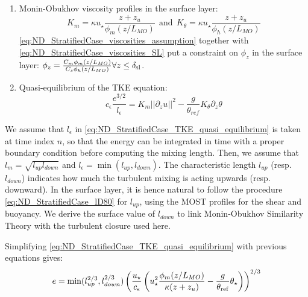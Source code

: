 \begin{enumerate}
\item
Monin-Obukhov viscosity profiles in the surface layer:
\begin{equation}
	\label{eq:ND_StratifiedCase_viscosities_SL}
	K_m = \kappa u_\star\frac{z+ z_{u}}{\phi_m(z/L_{MO})} ~~\text{and}~~
K_\theta = \kappa u_\star\frac{z+ z_{u}}{\phi_h(z/L_{MO})}
\end{equation}
\eqref{eq:ND_StratifiedCase_viscosities_assumption}
together with \eqref{eq:ND_StratifiedCase_viscosities_SL} put
a constraint on $\phi_z$ in the surface layer:
$\phi_z = \frac{C_m\phi_m(z/L_{MO})}{C_s\phi_h(z/L_{MO})}
		\forall z\leq \delta_{\rm sl}$.
\item Quasi-equilibrium of the TKE equation:
\begin{equation}
	\label{eq:ND_StratifiedCase_TKE_quasi_equilibrium}
	c_\epsilon \frac{e^{3/2}}{l_\epsilon}=K_m ||\partial_z u||^2 - \frac{g}{\theta_{ref}} K_\theta \partial_z \theta
\end{equation}
\end{enumerate}
We assume that $l_\epsilon$ in
\eqref{eq:ND_StratifiedCase_TKE_quasi_equilibrium} is taken at
time index $n$, so that the energy can be integrated in time
with a proper boundary condition before computing the mixing
length. Then, we assume that $l_m = \sqrt{l_{up}l_{down}}$ and
$l_\epsilon = \min(l_{up}, l_{down})$.
The characteristic length $l_{up}$ (resp. $l_{down}$) indicates
how much the turbulent mixing is acting upwards (resp. downward).
In the surface layer, it is hence natural to follow the
procedure \eqref{eq:ND_StratifiedCase_lD80} for $l_{up}$,
using the MOST profiles for the shear and buoyancy.
We derive the surface value of $l_{down}$ to link Monin-Obukhov
Similarity Theory with the turbulent closure used here.
\par
Simplifying \eqref{eq:ND_StratifiedCase_TKE_quasi_equilibrium}
with previous equations gives:
\begin{equation}
	\label{eq:ND_StratifiedCase_TKE_quasi_equilibrium_simplified}
	e = \min(l_{up}^{2/3}, l_{down}^{2/3})\left(
	\frac{u_\star}{c_\epsilon} 
	\left({u}_\star^2
	\frac{\phi_m(z/L_{MO})}{\kappa (z+z_{u})}
	- \frac{g}{\theta_{\rm ref}}\theta_\star
	\right)
	\right)^{2/3}
\end{equation}

